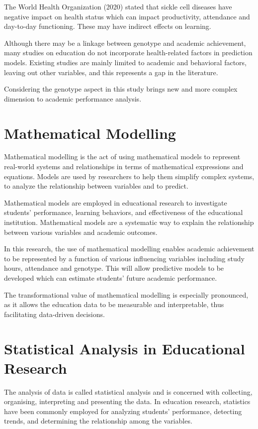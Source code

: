 \documentclass[12pt]{report}
\begin{document}
	The World Health Organization (2020) stated that sickle cell diseases have negative impact on health status which can impact productivity, attendance and day-to-day functioning. These may have indirect effects on learning.
	
	Although there may be a linkage between genotype and academic achievement, many studies on education do not incorporate health-related factors in prediction models. Existing studies are mainly limited to academic and behavioral factors, leaving out other variables, and this represents a gap in the literature.
	
	Considering the genotype aspect in this study brings new and more complex dimension to academic performance analysis.
	\section{Mathematical Modelling}
	Mathematical modelling is the act of using mathematical models to represent real-world systems and relationships in terms of mathematical expressions and equations. Models are used by researchers to help them simplify complex systems, to analyze the relationship between variables and to predict.
	
	Mathematical models are employed in educational research to investigate students' performance, learning behaviors, and effectiveness of the educational institution. Mathematical models are a systematic way to explain the relationship between various variables and academic outcomes.
	
	In this research, the use of mathematical modelling enables academic achievement to be represented by a function of various influencing variables including study hours, attendance and genotype. This will allow predictive models to be developed which can estimate students' future academic performance.
	
	The transformational value of mathematical modelling is especially pronounced, as it allows the education data to be measurable and interpretable, thus facilitating data-driven decisions.
	\section{Statistical Analysis in Educational Research}
	The analysis of data is called statistical analysis and is concerned with collecting, organising, interpreting and presenting the data. In education research, statistics have been commonly employed for analyzing students' performance, detecting trends, and determining the relationship among the variables.
	
\end{document}
